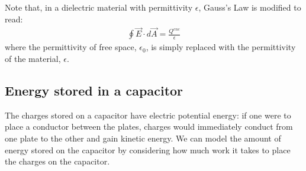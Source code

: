 
Note that, in a dielectric material with permittivity $\epsilon$, Gauss's Law is modified to read:
\begin{align*}
\oint \vec E\cdot d\vec A=\frac{Q^{enc}}{\epsilon}
\end{align*}
where the permittivity of free space, $\epsilon_0$, is simply replaced with the permittivity of the material, $\epsilon$.

\subsection{Energy stored in a capacitor}
The charges stored on a capacitor have electric potential energy: if one were to place a conductor between the plates, charges would immediately conduct from one plate to the other and gain kinetic energy. We can model the amount of energy stored on the capacitor by considering how much work it takes to place the charges on the capacitor.

